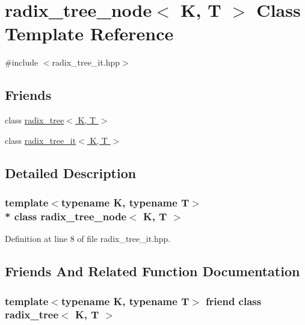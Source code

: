 \hypertarget{classradix__tree__node}{}\section{radix\+\_\+tree\+\_\+node$<$ K, T $>$ Class Template Reference}
\label{classradix__tree__node}


{\ttfamily \#include $<$radix\+\_\+tree\+\_\+it.\+hpp$>$}

\subsection*{Friends}
\begin{DoxyCompactItemize}
\item 
class \hyperlink{classradix__tree__node_a0596aeb27884e8ff44f365527f6a8f12}{radix\+\_\+tree$<$ K, T $>$}
\item 
class \hyperlink{classradix__tree__node_a11139749f60f9d620915dd76917d1479}{radix\+\_\+tree\+\_\+it$<$ K, T $>$}
\end{DoxyCompactItemize}


\subsection{Detailed Description}
\subsubsection*{template$<$typename K, typename T$>$\\*
class radix\+\_\+tree\+\_\+node$<$ K, T $>$}



Definition at line 8 of file radix\+\_\+tree\+\_\+it.\+hpp.



\subsection{Friends And Related Function Documentation}
\subsubsection[{\texorpdfstring{radix\+\_\+tree$<$ K, T $>$}{radix_tree< K, T >}}]{\setlength{\rightskip}{0pt plus 5cm}template$<$typename K, typename T$>$ friend class {\bf radix\+\_\+tree}$<$ K, T $>$\hspace{0.3cm}{\ttfamily [friend]}}\hypertarget{classradix__tree__node_a0596aeb27884e8ff44f365527f6a8f12}{}\label{classradix__tree__node_a0596aeb27884e8ff44f365527f6a8f12}


